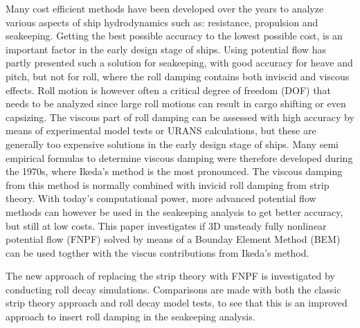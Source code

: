 Many cost efficient methods have been developed over the years to analyze various aspects of ship hydrodynamics such as: resistance, propulsion and seakeeping. Getting the best possible accuracy to the lowest possible cost, is an important factor in the early design stage of ships. Using potential flow has partly presented such a solution for seakeeping, with good accuracy for heave and pitch, but not for roll, where the roll damping contains both inviscid and viscous effects. Roll motion is however often a critical degree of freedom (DOF) that needs to be analyzed since large roll motions can result in cargo shifting or even capsizing. 
The viscous part of roll damping can be assessed with high accuracy by means of experimental model tests or URANS calculations, but these are generally too expensive solutions in the early design stage of ships. Many semi empirical formulas to determine viscous damping were therefore developed during the 1970s, where Ikeda's method is the most pronounced. 
The viscous damping from this method is normally combined with invicid roll damping from strip theory. With today's computational power, more advanced potential flow methods can however be used in the seakeeping analysis to get better accuracy, but still at low costs. 
This paper investigates if 3D unsteady fully nonlinear potential flow (FNPF) solved by means of a Bounday Element Method (BEM) can be used togther with the viscus contributions from Ikeda's method.

The new approach of replacing the strip theory with FNPF is investigated by conducting roll decay simulations. Comparisons are made with both the classic strip theory approach and roll decay model tests, to see that this is an improved approach to insert roll damping in the seakeeping analysis. 

 




